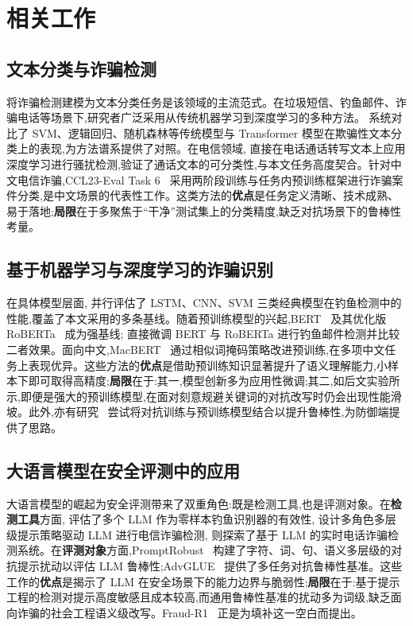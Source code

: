 \documentclass[11pt,a4paper]{article}
\begin{document}
\section{相关工作}

\subsection{文本分类与诈骗检测}

将诈骗检测建模为文本分类任务是该领域的主流范式。在垃圾短信、钓鱼邮件、诈骗电话等场景下,研究者广泛采用从传统机器学习到深度学习的多种方法。\citet{deceptivetext2023} 系统对比了 SVM、逻辑回归、随机森林等传统模型与 Transformer 模型在欺骗性文本分类上的表现,为方法谱系提供了对照。在电信领域,\citet{spamcalltranscript2021} 直接在电话通话转写文本上应用深度学习进行骚扰检测,验证了通话文本的可分类性,与本文任务高度契合。针对中文电信诈骗,CCL23-Eval Task 6~\cite{ccl23task6} 采用两阶段训练与任务内预训练框架进行诈骗案件分类,是中文场景的代表性工作。这类方法的\textbf{优点}是任务定义清晰、技术成熟、易于落地;\textbf{局限}在于多聚焦于“干净”测试集上的分类精度,缺乏对抗场景下的鲁棒性考量。

\subsection{基于机器学习与深度学习的诈骗识别}

在具体模型层面,\citet{lstmcnnsvm2025} 并行评估了 LSTM、CNN、SVM 三类经典模型在钓鱼检测中的性能,覆盖了本文采用的多条基线。随着预训练模型的兴起,BERT~\cite{devlin2019bert} 及其优化版 RoBERTa~\cite{liu2019roberta} 成为强基线;\citet{phishingbertroberta2026} 直接微调 BERT 与 RoBERTa 进行钓鱼邮件检测并比较二者效果。面向中文,MacBERT~\cite{cui2020macbert} 通过相似词掩码策略改进预训练,在多项中文任务上表现优异。这些方法的\textbf{优点}是借助预训练知识显著提升了语义理解能力,小样本下即可取得高精度;\textbf{局限}在于:其一,模型创新多为应用性微调;其二,如后文实验所示,即便是强大的预训练模型,在面对刻意规避关键词的对抗改写时仍会出现性能滑坡。此外,亦有研究~\cite{advtraining2024} 尝试将对抗训练与预训练模型结合以提升鲁棒性,为防御端提供了思路。

\subsection{大语言模型在安全评测中的应用}

大语言模型的崛起为安全评测带来了双重角色:既是检测工具,也是评测对象。在\textbf{检测工具}方面,\citet{llmphishing2024} 评估了多个 LLM 作为零样本钓鱼识别器的有效性,\citet{telecomfraud2026llm} 设计多角色多层级提示策略驱动 LLM 进行电信诈骗检测,\citet{phonescams2025} 则探索了基于 LLM 的实时电话诈骗检测系统。在\textbf{评测对象}方面,PromptRobust~\cite{zhu2023promptbench} 构建了字符、词、句、语义多层级的对抗提示扰动以评估 LLM 鲁棒性;AdvGLUE~\cite{wang2021advglue} 提供了多任务对抗鲁棒性基准。这些工作的\textbf{优点}是揭示了 LLM 在安全场景下的能力边界与脆弱性;\textbf{局限}在于:基于提示工程的检测对提示高度敏感且成本较高,而通用鲁棒性基准的扰动多为词级,缺乏面向诈骗的社会工程语义级改写。Fraud-R1~\cite{yang2025fraudr1} 正是为填补这一空白而提出。
\end{document}
